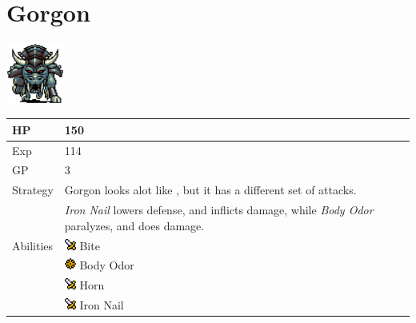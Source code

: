 \section{Gorgon}
\label{monster:gorgon}

\includegraphics[height=2cm,keepaspectratio]{./resources/monster/gorgon}

\begin{longtable}{ l p{9cm} }
	HP
	& 150
\\ \hline
	Exp
	& 114
\\ \hline
	GP
	& 3
\\ \hline
	Strategy
	& Gorgon looks alot like \nameref{monster:behemoth}, but it has a different set of attacks. \\
	& \textit{Iron Nail} lowers defense, and inflicts damage, while \textit{Body Odor} paralyzes, and does damage.
\\ \hline
	Abilities
	& \includegraphics[height=1em,keepaspectratio]{./resources/effects/damage} Bite \\
	& \includegraphics[height=1em,keepaspectratio]{./resources/effects/paralyze} Body Odor \\
	& \includegraphics[height=1em,keepaspectratio]{./resources/effects/damage} Horn \\
	& \includegraphics[height=1em,keepaspectratio]{./resources/effects/damage} Iron Nail
\end{longtable}
